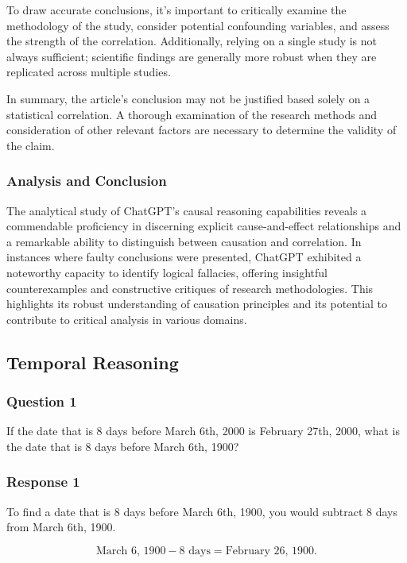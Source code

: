 \documentclass[12pt, a4paper]{article}
\begin{document}
To draw accurate conclusions, it's important to critically examine the methodology of the study, consider potential confounding variables, and assess the strength of the correlation. Additionally, relying on a single study is not always sufficient; scientific findings are generally more robust when they are replicated across multiple studies.

In summary, the article's conclusion may not be justified based solely on a statistical correlation. A thorough examination of the research methods and consideration of other relevant factors are necessary to determine the validity of the claim.


\subsubsection*{Analysis and Conclusion}
The analytical study of ChatGPT's causal reasoning capabilities reveals a commendable proficiency in discerning explicit cause-and-effect relationships and a remarkable ability to distinguish between causation and correlation. In instances where faulty conclusions were presented, ChatGPT exhibited a noteworthy capacity to identify logical fallacies, offering insightful counterexamples and constructive critiques of research methodologies. This highlights its robust understanding of causation principles and its potential to contribute to critical analysis in various domains.


\subsection*{Temporal Reasoning}
\subsubsection*{Question 1}

If the date that is 8 days before March 6th, 2000 is February 27th, 2000, what is the date that is 8 days before March 6th, 1900?

\subsubsection*{Response 1}

To find a date that is 8 days before March 6th, 1900, you would subtract 8 days from March 6th, 1900.

$$ \text{March 6, 1900} - 8 \text{ days} = \text{February 26, 1900}. $$
\end{document}
